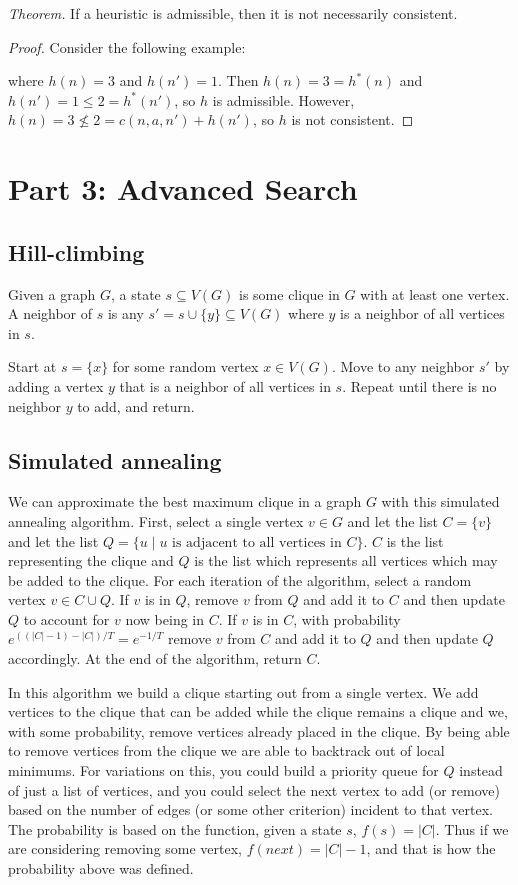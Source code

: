 \documentclass[11pt]{amsart}
\begin{document}
\emph{Theorem.}
If a heuristic is admissible, then it is not necessarily consistent.

\begin{proof}
Consider the following example:

\vspace*{1in}

where $h(n) = 3$ and $h(n') = 1$.  Then $h(n) = 3 = h^*(n)$ and $h(n') = 1 \leq 2 = h^*(n')$,
so $h$ is admissible.  However, $h(n) = 3 \nleq 2 = c(n, a, n') + h(n')$, so $h$ is not consistent.
\end{proof}

\section*{Part 3: Advanced Search}

\subsection*{Hill-climbing}  Given a graph $G$, a state $s \subseteq V(G)$ is some clique in $G$
with at least one vertex.  A neighbor of $s$ is any $s' = s \cup \{y\} \subseteq V(G)$ where $y$ is a
neighbor of all vertices in $s$.

Start at $s = \{x\}$ for some random vertex $x \in V(G)$.  Move to any neighbor $s'$ by adding a
vertex $y$ that is a neighbor of all vertices in $s$.  Repeat until there is no neighbor $y$ to add,
and return.

\subsection*{Simulated annealing}
We can approximate the best maximum clique in a graph $G$ with this simulated
annealing algorithm.  First, select a single vertex $v \in G$ and let the list
$C = \{v\}$ and let the list $Q = \{u \mid u \text{ is adjacent to all vertices
in } C\}$.  $C$ is the list representing the clique and $Q$ is the list which
represents all vertices which may be added to the clique.  For each iteration
of the algorithm, select a random vertex $v \in C \cup Q$.  If $v$ is in $Q$,
remove $v$ from $Q$ and add it to $C$ and then update $Q$ to account for $v$
now being in $C$.  If $v$ is in $C$, with probability $e^{((|C|-1)-|C|)/T} =
e^{-1/T}$ remove $v$ from $C$ and add it to $Q$ and then update $Q$
accordingly.  At the end of the algorithm, return $C$.  

In this algorithm we build a clique starting out from a single vertex.  We add
vertices to the clique that can be added while the clique remains a clique and
we, with some probability, remove vertices already placed in the clique.  By
being able to remove vertices from the clique we are able to backtrack out of
local minimums.  For variations on this, you could build a priority queue for
$Q$ instead of just a list of vertices, and you could select the next vertex to
add (or remove) based on the number of edges (or some other criterion) incident
to that vertex.  The probability is based on the function, given a state $s$,
$f(s) = |C|$.  Thus if we are considering removing some vertex, $f(next) = |C|
- 1$, and that is how the probability above was defined.
\end{document}
